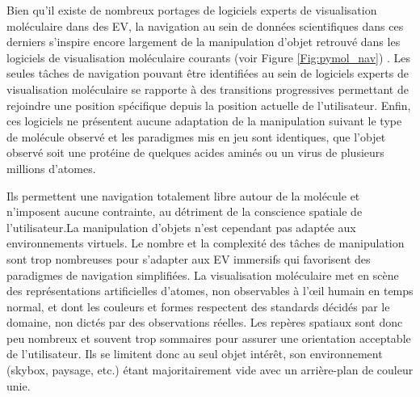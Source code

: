 Bien qu'il existe de nombreux portages de logiciels experts de visualisation moléculaire dans des EV, la navigation au sein de données scientifiques dans ces derniers s’inspire encore largement de la manipulation d'objet retrouvé dans les logiciels de visualisation moléculaire courants (voir Figure \ref{Fig:pymol_nav}) \cite{frohlich1999exploring}. Les seules tâches de navigation pouvant être identifiées au sein de logiciels experts de visualisation moléculaire se rapporte à des transitions progressives permettant de rejoindre une position spécifique depuis la position actuelle de l'utilisateur. Enfin, ces logiciels ne présentent aucune adaptation de la manipulation suivant le type de molécule observé et les paradigmes mis en jeu sont identiques, que l'objet observé soit une protéine de quelques acides aminés ou un virus de plusieurs millions d'atomes.

Ils permettent une navigation totalement libre autour de la molécule et n'imposent aucune contrainte, au détriment de la conscience spatiale de l'utilisateur.La manipulation d'objets n'est cependant pas adaptée aux environnements virtuels. Le nombre et la complexité des tâches de manipulation sont trop nombreuses pour s'adapter aux EV immersifs qui favorisent des paradigmes de navigation simplifiées. La visualisation moléculaire met en scène des représentations artificielles d'atomes, non observables à l’œil humain en temps normal, et dont les couleurs et formes respectent des standards décidés par le domaine, non dictés par des observations réelles. Les repères spatiaux sont donc peu nombreux et souvent trop sommaires pour assurer une orientation acceptable de l'utilisateur. Ils se limitent donc au seul objet intérêt, son environnement (skybox, paysage, etc.) étant majoritairement vide avec un arrière-plan de couleur unie.   
 

